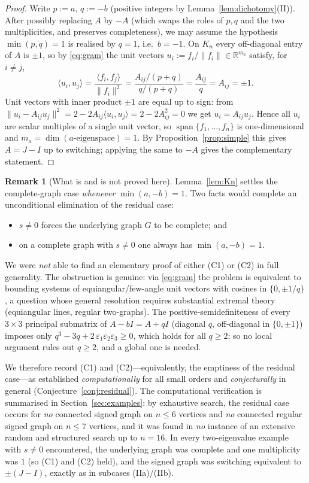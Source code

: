 \documentclass{amsart}
\theoremstyle{definition}
\newtheorem{remark}{Remark}
\begin{document}
\begin{proof}
Write $p:=a$, $q:=-b$ (positive integers by Lemma~\ref{lem:dichotomy}(II)).
After possibly replacing $A$ by $-A$ (which swaps the roles of $p,q$ and the
two multiplicities, and preserves completeness), we may assume the hypothesis
$\min(p,q)=1$ is realised by $q=1$, i.e.\ $b=-1$. On $K_n$ every off-diagonal
entry of $A$ is $\pm1$, so by \eqref{eq:gram} the unit vectors
$u_i:=f_i/\|f_i\|\in\mathbb R^{m_a}$ satisfy, for $i\ne j$,
\[
\langle u_i,u_j\rangle=\frac{\langle f_i,f_j\rangle}{\|f_i\|^2}
=\frac{A_{ij}/(p+q)}{q/(p+q)}=\frac{A_{ij}}{q}=A_{ij}=\pm1 .
\]
Unit vectors with inner product $\pm1$ are equal up to sign: from
$\|u_i-A_{ij}u_j\|^2=2-2A_{ij}\langle u_i,u_j\rangle=2-2A_{ij}^2=0$ we get
$u_i=A_{ij}u_j$. Hence all $u_i$ are scalar multiples of a single unit vector,
so $\operatorname{span}\{f_1,\dots,f_n\}$ is one-dimensional and
$m_a=\dim(\text{$a$-eigenspace})=1$. By Proposition~\ref{prop:simple} this
gives $A=J-I$ up to switching; applying the same to $-A$ gives the
complementary statement.
\end{proof}

\begin{remark}[What is and is not proved here]\label{rem:status}
Lemma~\ref{lem:Kn} settles the complete-graph case \emph{whenever}
$\min(a,-b)=1$. Two facts would complete an unconditional elimination of the
residual case:
\begin{itemize}
\item[(C1)] $s\ne0$ forces the underlying graph $G$ to be complete; and
\item[(C2)] on a complete graph with $s\ne0$ one always has $\min(a,-b)=1$.
\end{itemize}
We were \emph{not} able to find an elementary proof of either (C1) or (C2) in
full generality. The obstruction is genuine: via \eqref{eq:gram} the problem is
equivalent to bounding systems of equiangular/few-angle unit vectors with
cosines in $\{0,\pm1/q\}$, a question whose general resolution requires
substantial extremal theory (equiangular lines, regular two-graphs). The
positive-semidefiniteness of every $3\times3$ principal submatrix of
$A-bI=A+qI$ (diagonal $q$, off-diagonal in $\{0,\pm1\}$) imposes only
$q^3-3q+2\,\varepsilon_1\varepsilon_2\varepsilon_3\ge0$, which holds for all
$q\ge2$; so no local argument rules out $q\ge2$, and a global one is needed.

We therefore record (C1) and (C2)---equivalently, the emptiness of the
residual case---as established \emph{computationally} for all small orders and
\emph{conjecturally} in general (Conjecture~\ref{conj:residual}). The
computational verification is summarised in Section~\ref{sec:examples}: by
exhaustive search, the residual case occurs for \emph{no} connected signed
graph on $n\le6$ vertices and \emph{no} connected regular signed graph on
$n\le7$ vertices, and it was found in \emph{no} instance of an extensive random
and structured search up to $n=16$. In every two-eigenvalue example with
$s\ne0$ encountered, the underlying graph was complete and one multiplicity was
$1$ (so (C1) and (C2) held), and the signed graph was switching equivalent to
$\pm(J-I)$, exactly as in subcases (IIa)/(IIb).
\end{remark}
\end{document}
